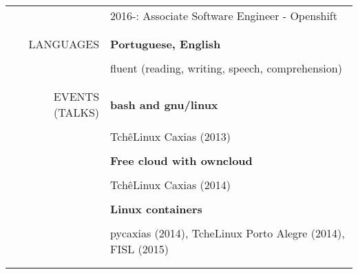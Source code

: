\begin{tabular}{rp{12cm}}
    & 2016-: Associate Software Engineer - Openshift
    \\\\
    \hline
    \\
    \uppercase{Languages}
    & \textbf{Portuguese, English} \\\\
    & fluent (reading, writing, speech, comprehension)
    \\\\
    \hline
    \\
    \uppercase{Events (talks)}
    & \textbf{bash and gnu/linux} \\\\
    & TchêLinux Caxias (2013) \\\\
    & \textbf{Free cloud with owncloud} \\\\
    & TchêLinux Caxias (2014) \\\\
    & \textbf{Linux containers} \\\\
    & pycaxias (2014), TcheLinux Porto Alegre (2014), FISL (2015)
    \\\\
    \hline
    \\
\end{tabular}
